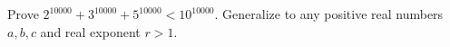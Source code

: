 Prove $2^{10000}+3^{10000}+5^{10000}<10^{10000}$. Generalize to any positive real numbers $a,b,c$ and real exponent $r>1$.
